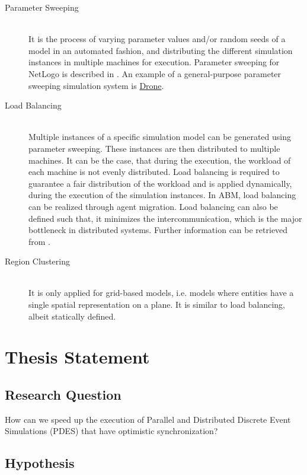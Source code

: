 \documentclass[a4paper]{article}
\begin{document}
\begin{description}
\item[Parameter Sweeping] \hfill \\
It is the process of varying parameter values and/or
random seeds of a model in an automated fashion, 
and distributing the different simulation instances in multiple machines for execution.
Parameter sweeping for NetLogo is described in \cite{koehler_clustered_2005}.
An example of a general-purpose parameter sweeping simulation system is \href{http://drone.sourceforge.net/}{Drone}.
\item[Load Balancing] \hfill \\
Multiple instances of a specific simulation model can be generated using parameter sweeping.
These instances are then distributed to multiple machines. It can be the case,
that during the execution, the workload of each machine is not evenly distributed.
Load balancing is required to guarantee a fair distribution of the workload and is
applied dynamically, during the execution of the simulation instances.
In ABM, load balancing can be realized through agent migration. Load balancing can also
be defined such that, it minimizes the intercommunication, which is the major bottleneck
in distributed systems. Further information can be retrieved from \cite{chow_load_2002}.

\item[Region Clustering] \hfill \\

It is only applied for grid-based models, i.e. models where entities have a single spatial
representation on a plane. It is similar to load balancing, albeit statically defined.

\end{description}



\section{Thesis Statement}

\subsection{Research Question}

How can we speed up the execution of Parallel and Distributed Discrete
Event Simulations (PDES) that have optimistic synchronization?

\subsection{Hypothesis}
\end{document}
